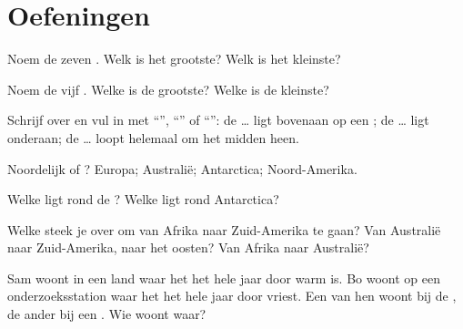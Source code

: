 \section{Oefeningen}

\begin{exercise}[$\star$]\label{exo:g3:continents-and-oceans:1}
Noem de zeven . Welk is het grootste? Welk is het kleinste?
\end{exercise}

\begin{exercise}[$\star$]\label{exo:g3:continents-and-oceans:2}
Noem de vijf . Welke is de grootste? Welke is de kleinste?
\end{exercise}

\begin{exercise}[$\star$]\label{exo:g3:continents-and-oceans:3}
Schrijf over en vul in met ``'', ``'' of ``'': de
\dots{} ligt bovenaan op een ; de \dots{} ligt onderaan; de \dots{}
loopt helemaal om het midden heen.
\end{exercise}

\begin{exercise}[$\star$]\label{exo:g3:continents-and-oceans:4}
Noordelijk of ? Europa; Australië; Antarctica;
Noord-Amerika.
\end{exercise}

\begin{exercise}[$\star$]\label{exo:g3:continents-and-oceans:5}
Welke  ligt rond de ? Welke  ligt rond
Antarctica?
\end{exercise}

\begin{exercise}[$\star\star$]\label{exo:g3:continents-and-oceans:6}
Welke  steek je over om van Afrika naar Zuid-Amerika te gaan? Van
Australië naar Zuid-Amerika, naar het oosten? Van Afrika naar Australië?
\end{exercise}

\begin{exercise}[$\star\star$]\label{exo:g3:continents-and-oceans:7}
Sam woont in een land waar het het hele jaar door warm is. Bo woont op een
onderzoeksstation waar het het hele jaar door vriest. Een van hen woont bij
de , de ander bij een . Wie woont waar?
\end{exercise}

